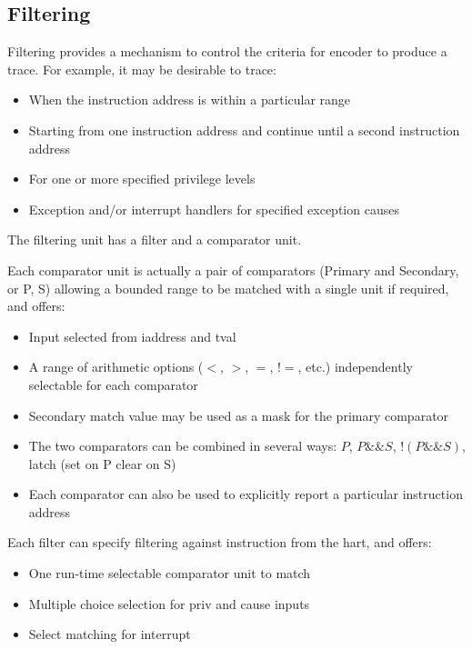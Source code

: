 \documentclass[main\_\_EN.tex]{subfiles}
\begin{document}
\subsection{Filtering}\label{sec:riscvtracenc-filter}

Filtering provides a mechanism to control the criteria for encoder to produce a trace. For example, it may be desirable to trace:
\begin{itemize}
    \item When the instruction address is within a particular range
    \item Starting from one instruction address and continue until a second instruction address
    \item For one or more specified privilege levels
    \item Exception and/or interrupt handlers for specified exception causes
\end{itemize}

The filtering unit has a filter and a comparator unit.

Each comparator unit is actually a pair of comparators (Primary and Secondary, or P, S) allowing a bounded range to be matched with a single unit if required, and offers:

\begin{itemize}
    \item Input selected from iaddress and tval
    \item A range of arithmetic options ($<$, $>$, $=$, $!=$, etc.) independently selectable for each comparator
    \item Secondary match value may be used as a mask for the primary comparator
    \item The two comparators can be combined in several ways: $P$, $P\&\&S$, $!(P\&\&S)$, latch (set on P clear on S)
    \item Each comparator can also be used to explicitly report a particular instruction address
\end{itemize}

Each filter can specify filtering against instruction from the hart, and offers:
\begin{itemize}
    \item One run-time selectable comparator unit to match
    \item Multiple choice selection for priv and cause inputs
    \item Select matching for interrupt
\end{itemize}
\end{document}
